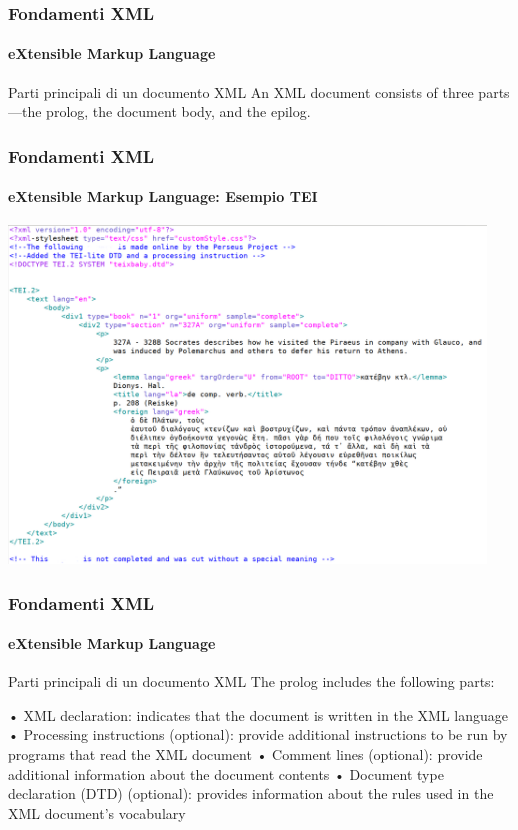 \begin{frame}
	\frametitle{Fondamenti XML}
	\framesubtitle{eXtensible Markup Language}
	\addtocounter{nframe}{1}

	\begin{block}{Parti principali di un documento XML}
        An XML document consists of three parts—the prolog, the document body, and the
        epilog. 
	\end{block}

\end{frame}


\begin{frame}
	\frametitle{Fondamenti XML}
	\framesubtitle{eXtensible Markup Language: Esempio TEI}
	\addtocounter{nframe}{1}

	\begin{center}
		\includegraphics[width=0.95\textwidth]{imgs/TEI-PerseusExample.png}
	\end{center}

\end{frame}


\begin{frame}
	\frametitle{Fondamenti XML}
	\framesubtitle{eXtensible Markup Language}
	\addtocounter{nframe}{1}

	\begin{block}{Parti principali di un documento XML}
        The prolog includes the following parts:
        
        • XML declaration: indicates that the document is written in the XML language
        • Processing instructions (optional): provide additional instructions to be run by
        programs that read the XML document
        • Comment lines (optional): provide additional information about the document
        contents
        • Document type declaration (DTD) (optional): provides information about the rules
        used in the XML document’s vocabulary
	\end{block}

\end{frame}


